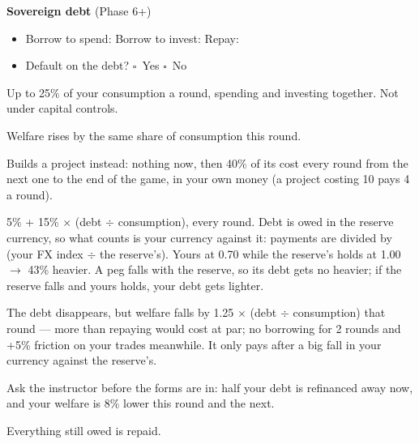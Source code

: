 \documentclass[11pt]{article}
\newcommand{\blank}[1]{\underline{\hspace{#1}}}
\newcommand{\boxx}{$\square$}
\begin{document}
\vspace{4pt}
{\bfseries Sovereign debt} (Phase 6+)\par
\begin{itemize}[nosep,leftmargin=1.4em]
  \item Borrow to spend: \blank{2.2cm} \quad Borrow to invest: \blank{2.2cm} \quad Repay: \blank{2.2cm}
  \item Default on the debt? \quad \boxx\ Yes \quad \boxx\ No
\end{itemize}
{\small
\begin{description}[nosep,style=sameline,leftmargin=5.6em,font=\normalfont\bfseries]
  \item[Borrow] Up to 25\% of your consumption a round, spending and investing together. Not under capital controls.
  \item[Spend] Welfare rises by the same share of consumption this round.
  \item[Invest] Builds a project instead: nothing now, then 40\% of its cost every round from the next one to the end of the game, in your own money (a project costing 10 pays 4 a round).
  \item[Interest] 5\% + 15\% $\times$ (debt $\div$ consumption), every round. Debt is owed in the reserve currency, so what counts is your currency against it: payments are divided by (your FX index $\div$ the reserve's). Yours at 0.70 while the reserve's holds at 1.00 $\to$ 43\% heavier. A peg falls with the reserve, so its debt gets no heavier; if the reserve falls and yours holds, your debt gets lighter.
  \item[Default] The debt disappears, but welfare falls by 1.25 $\times$ (debt $\div$ consumption) that round --- more than repaying would cost at par; no borrowing for 2 rounds and +5\% friction on your trades meanwhile. It only pays after a big fall in your currency against the reserve's.
  \item[IMF] Ask the instructor before the forms are in: half your debt is refinanced away now, and your welfare is 8\% lower this round and the next.
  \item[Last round] Everything still owed is repaid.
\end{description}}
\end{document}
